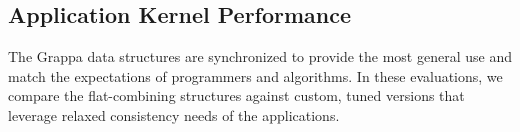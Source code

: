 \subsection{Application Kernel Performance}
The Grappa data structures are synchronized to provide the most general use and match the expectations of programmers and algorithms.
In these evaluations, we compare the flat-combining structures against custom, tuned versions that leverage relaxed consistency needs of the applications.

